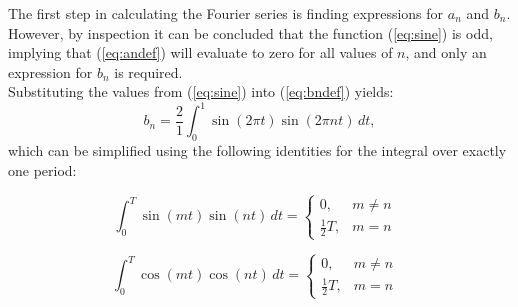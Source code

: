 \documentclass[a4paper, onecolumn, 12pt]{IEEEtran}
\begin{document}
The first step in calculating the Fourier series is finding expressions for $a_n$ and $b_n$. However, by inspection it can be concluded that the function (\ref{eq:sine}) is odd, implying that (\ref{eq:andef}) will evaluate to zero for all values of $n$, and only an expression for $b_n$ is required. \\ 
Substituting the values from (\ref{eq:sine}) into (\ref{eq:bndef}) yields:
\begin{equation}
    \label{eqn:bn_sin}
    b_n = \frac{2}{1} \int_{0}^{1} \sin (2 \pi t) \sin (2 \pi n t) \, dt,
\end{equation}
which can be simplified using the following identities for the integral over exactly one period:

    \begin{equation}
        \int_{0}^{T} \sin (m t) \sin (n t) \, dt = 
        \left\{
            \begin{array}{lr}
                0,            & m \ne n\\
                \frac{1}{2}T, & m = n 
            \end{array}\nonumber
        \right. \ \ \ 
    \end{equation}
    
    \begin{equation}
        \int_{0}^{T} \cos (m t) \cos (n t) \, dt = 
        \left\{
            \begin{array}{lr}
                0,            & m \ne n\\
                \frac{1}{2}T, & m = n \nonumber
            \end{array}
        \right. \ \ \ 
    \end{equation}
    
\end{document}
